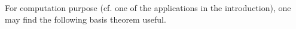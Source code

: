 \noindent For computation purpose (cf. one of the applications in the
introduction), one may find the following basis theorem useful.






